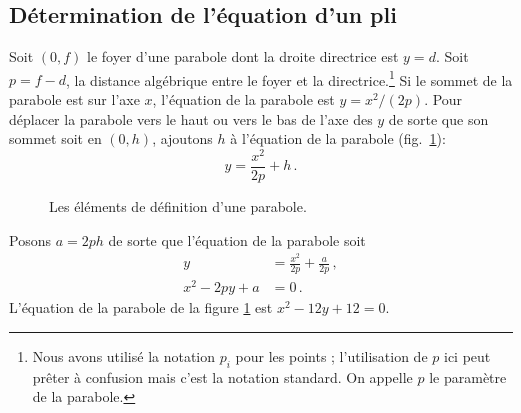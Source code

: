 \subsection{Détermination de l'équation d'un pli}

Soit $(0,f)$ le foyer d'une parabole dont la droite directrice est $y=d$. Soit $p=f-d$, la distance algébrique  entre le foyer et la directrice.\footnote{Nous avons utilisé la notation $p_i$ pour les points ; l'utilisation de $p$ ici peut prêter à confusion mais c'est la notation standard. On appelle $p$  le paramètre de la parabole.} Si le sommet de la parabole est sur l'axe $x$, l'équation de la parabole est $y=x^2/(2p)$. Pour déplacer la parabole vers le haut ou vers le bas de l'axe des $y$ de sorte que son sommet soit en $(0,h)$, ajoutons $h$ à l'équation de la parabole (fig.~\ref{f.elements-parabola}):
\[y=\frac{x^2}{2p}+h\,.\]


\begin{figure}[htb]
\begin{center}
\end{center}
\caption{Les éléments de définition d'une parabole.}\label{f.elements-parabola}
\end{figure}

Posons $a=2ph$ de sorte que l'équation de la parabole soit 
\begin{subequations}
\begin{align}
y&=\frac{x^2}{2p}+\frac{a}{2p}\,,\\
x^2-2py+a&=0\,.\label{eq.eq-parabola}
\end{align}
\end{subequations}
L'équation de la parabole de la figure \ref{f.elements-parabola} est  $x^2-12y +12=0$.

